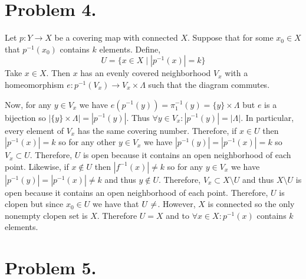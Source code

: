 \documentclass[12pt]{extarticle}
\begin{document}
\section*{Problem 4.}
Let $p : Y \to X$ be a covering map with connected $X$. Suppose that for some $x_0 \in X$ that $p^{-1}(x_0)$ contains $k$ elements. Define,
\[U = \{x \in X \mid |p^{-1}(x)| = k\}\]
Take $x \in X$. Then $x$ has an evenly covered neighborhood $V_x$ with a homeomorphism $e : p^{-1}(V_x) \to V_x \times \Lambda$ such that the diagram commutes.

\begin{center}
\end{center}
Now, for any $y \in V_x$ we have $e(p^{-1}(y)) = \pi_1^{-1}(y) = \{y\} \times \Lambda$ but $e$ is a bijection so $|\{y\} \times \Lambda| = |p^{-1}(y)|$. Thus $\forall y \in V_x : |p^{-1}(y)| = |\Lambda|$. In particular, every element of $V_x$ has the same covering number. Therefore, if $x \in U$ then $|p^{-1}(x)| = k$ so for any other $y \in V_x$ we have $|p^{-1}(y)| = |p^{-1}(x)| = k$ so $V_x \subset U$. Therefore, $U$ is open because it contains an open neighborhood of each point. Likewise, if $x \notin U$ then $|f^{-1}(x)| \neq k$ so for any $y \in V_x$ we have $|p^{-1}(y)| = |p^{-1}(x)| \neq k$ and thus $y \notin U$. Therefore, $V_x \subset X \setminus U$ and thus $X \setminus U$ is open because it contains an open neighborhood of each point. Therefore, $U$ is clopen but since $x_0 \in U$ we have that $U \neq \empty$. However, $X$ is connected so the only nonempty clopen set is $X$. Therefore $U = X$ and to $\forall x \in X : p^{-1}(x)$ contains $k$ elements.      

\section*{Problem 5.}
\end{document}
